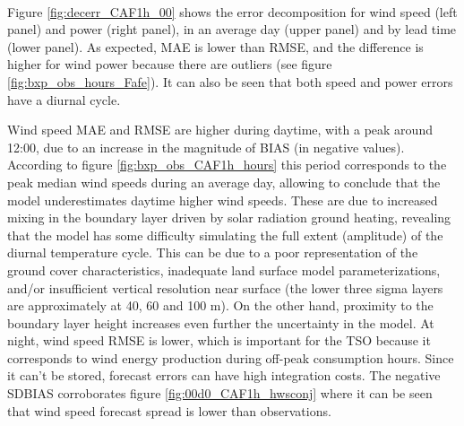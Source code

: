 \begin{figure}[!htp]
  \centering
  \\
  \label{fig:00d0_AGM1h}
\end{figure}
\FloatBarrier

Figure \ref{fig:decerr_CAF1h_00} shows the error decomposition for wind speed (left panel) and power (right panel), in an average day (upper panel) and by lead time (lower panel). As expected, MAE is lower than RMSE, and the difference is higher for wind power because there are outliers (see figure \ref{fig:bxp_obs_hours_Fafe}). It can also be seen that both speed and power errors have a diurnal cycle. 

Wind speed MAE and RMSE are higher during daytime, with a peak around 12:00, due to an increase in the magnitude of BIAS (in negative values). According to figure \ref{fig:bxp_obs_CAF1h_hours} this period corresponds to the peak median wind speeds during an average day, allowing to conclude that the model underestimates daytime higher wind speeds. These are due to increased mixing in the boundary layer driven by solar radiation ground heating, revealing that the model has some difficulty simulating the full extent (amplitude) of the diurnal temperature cycle. This can be due to a poor representation of the ground cover characteristics, inadequate land surface model parameterizations, and/or insufficient vertical resolution near surface (the lower three sigma layers are approximately at 40, 60 and 100 m). On the other hand, proximity to the boundary layer height increases even further the uncertainty in the model. At night, wind speed RMSE is lower, which is important for the TSO because it corresponds to wind energy production during off-peak consumption hours. Since it can't be stored, forecast errors can have high integration costs. The negative SDBIAS corroborates figure \ref{fig:00d0_CAF1h_hwsconj} where it can be seen that wind speed forecast spread is lower than observations. 

